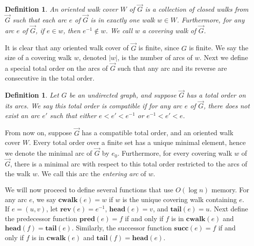 \documentclass[12pt,letterpaper,oneside]{book}
\newcommand{\rev}{\textbf{rev}}
\newcommand{\suc}{\textbf{succ}}
\newcommand{\pred}{\textbf{pred}}
\newcommand{\cwalk}{\textbf{cwalk}}
\newcommand{\head}{\textbf{head}}
\newcommand{\tail}{\textbf{tail}}
\newtheorem{definition}[theorem]{Definition}
\begin{document}
\begin{definition}
\label{def-ocw}
An oriented walk cover $W$ of $\vec{G}$ is a collection of closed walks from $\vec{G}$ such that 
each arc $e$ of $\vec{G}$ is in exactly one walk $w\in W$.  Furthermore, for any arc 
$e$ of $\vec{G}$, if $e\in w$, then $e^{-1} \notin w$.  We call $w$ a covering walk of $\vec{G}$.
\end{definition} 

It is clear that any oriented walk cover of $\vec{G}$ is finite, since $G$ is finite.  We say the size 
of a covering walk $w$, denoted $|w|$, is the number of arcs of $w$.  
Next we define a special total order on the arcs of $\vec{G}$ such that any arc and its reverse are consecutive in the total order.

\begin{definition}
\label{def-compatible}
Let $G$ be an undirected graph, and suppose $\vec{G}$ has a total order on its arcs.  
We say this total order is compatible if for 
any arc $e$ of $\vec{G}$, there does not exist an arc $e'$ 
such that either $e<e'<e^{-1}$ or $e^{-1} < e' < e$.
\end{definition}

From now on, suppose $\vec{G}$ has a compatible total order, and an oriented walk cover $W$.  Every total 
order over a finite set has a unique minimal element, hence we denote the minimal arc of $\vec{G}$ by $e_0$.  
Furthermore, for every covering walk $w$ of $\vec{G}$, there is a minimal arc with respect to this total order restricted to the 
arcs of the walk $w$.  We call this arc the \emph{entering arc} of $w$.  


We will now proceed to define several functions that use $O(\log n)$ memory.  
For any arc $e$, we say $\cwalk(e)=w$ if $w$ is the unique covering walk containing $e$.   
If $e=(u,v)$, let $\rev(e)=e^{-1}$, $\head(e)=v$, and $\tail(e)=u$.   
Next define the predecessor function $\pred(e)=f$ if and only if $f$ is in $\cwalk(e)$ and $\head(f)=\tail(e)$.  
Similarly, the successor function $\suc(e)=f$ if and only if $f$ is in $\cwalk(e)$ and $\tail(f)=\head(e)$.  
\end{document}
